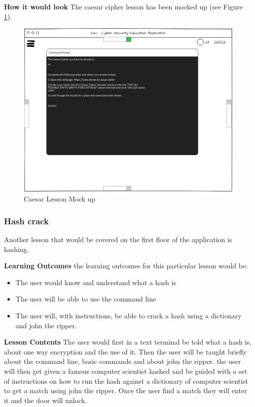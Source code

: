 \documentclass[12pt,a4paper]{article}
\begin{document}
\textbf{How it would look}  
The caesar cipher lesson has been mocked up (see Figure \ref{caesarmock}).
\begin{figure}[h]
    \centering
    \includegraphics[width=1.0\textwidth]{Figs/caesermock.PNG} 
    \caption{Caesar Lesson Mock up} 
    \label{caesarmock}
\end{figure}   


 


 
\subsubsection{Hash crack}   
Another lesson that would be covered on the first floor of the application is hashing. 

\textbf{Learning Outcomes} 
\newline the learning outcomes for this particular lesson would be:  

\begin{itemize}\itemsep0pt
	\item The user would know and understand what a hash is 
	\item The user will be able to use the command line 
	\item The user will, with instructions, be able to crack a hash using a dictionary and john the ripper. 
\end{itemize} 

\textbf{Lesson Contents} 
\newline The user would first in a text terminal be told what a hash is, about one way encryption and the use of it. Then the user will be taught briefly about the command line, basic commands and about john the ripper. the user will then get given a famous computer scientist hashed and be guided with a set of instructions on how to run the hash against a dictionary of computer scientist to get a match using john the ripper. Once the user find a match they will enter it and the door will unlock.
\end{document}

